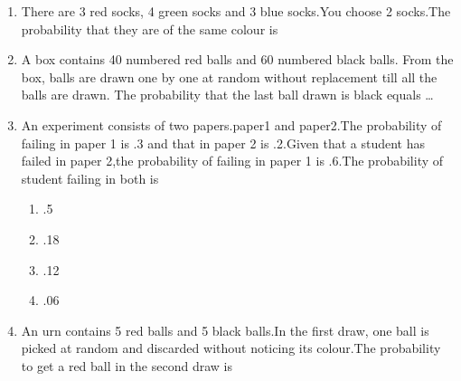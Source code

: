 \renewcommand{\theequation}{\theenumi}
\renewcommand{\thefigure}{\theenumi}
\renewcommand{\thetable}{\theenumi}
\begin{enumerate}[label=\thesection.\arabic*.,ref=\thesection.\theenumi]

\item There are 3 red socks, 4 green socks and 3 blue socks.You choose 2 socks.The probability that they are of the same colour is

\begin{enumerate}
\end{enumerate}
\solution

%
\item A box contains 40 numbered red balls and 60 numbered black balls. From the box, balls are drawn one by one at random without replacement till all the balls are drawn. The probability that the last ball drawn is black equals \dots


\item An experiment consists of two papers.paper1 and paper2.The probability of failing in paper 1 is .3 and that in paper 2 is .2.Given that a student has failed in paper 2,the probability of failing in paper 1 is .6.The probability of student failing in both is\\
\begin{enumerate}
    \setlength\itemsep{2em}
\item .5 
\item .18 
\item .12 
\item .06 
\end{enumerate}
%
\solution

%
\item An urn contains 5 red balls and 5 black balls.In the first draw, one ball is picked at random and discarded without noticing its colour.The probability to get a red ball in the second draw is 
\begin{enumerate}
    \begin{multicols}{4}
    \setlength\itemsep{2em}
    

\end{multicols}
\end{enumerate}
\end{enumerate}
